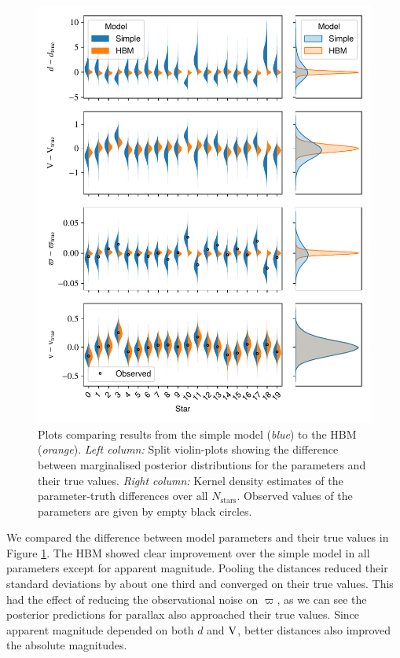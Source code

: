 \begin{figure}[p]
    \centering
    \includegraphics{figures/hbm-results.pdf}
    \caption[Plots comparing results from the simple model to the HBM]{Plots comparing results from the simple model (\emph{blue}) to the HBM (\emph{orange}). \emph{Left column:} Split violin-plots showing the difference between marginalised posterior distributions for the parameters and their true values. \emph{Right column:} Kernel density estimates of the parameter-truth differences over all \(N_\mathrm{stars}\). Observed values of the parameters are given by empty black circles.}
    \label{fig:hbm-results}
\end{figure}

We compared the difference between model parameters and their true values in Figure \ref{fig:hbm-results}. The HBM showed clear improvement over the simple model in all parameters except for apparent magnitude. Pooling the distances reduced their standard deviations by about one third and converged on their true values. This had the effect of reducing the observational noise on \(\varpi\), as we can see the posterior predictions for parallax also approached their true values. Since apparent magnitude depended on both \(d\) and \(\mathrm{V}\), better distances also improved the absolute magnitudes.

